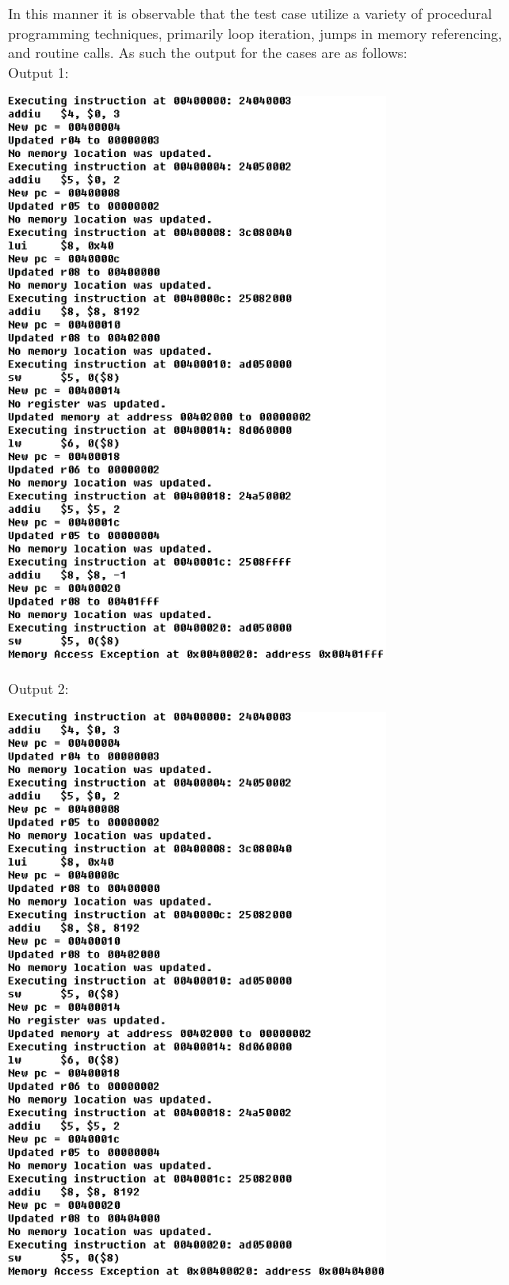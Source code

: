 \documentclass[12pt]{article}
\begin{document}
{\begin{center}
\end{center}
In this manner it is observable that the test case utilize a variety of procedural programming techniques, primarily loop iteration, jumps in memory referencing, and routine calls. As such the output for the cases are as follows:
\\
Output 1:
\begin{center}
\includegraphics[width=100mm]{output1.png}
\end{center}
Output 2:
\begin{center}
\includegraphics[width=100mm]{output2.png}

\end{center}}
\end{document}
